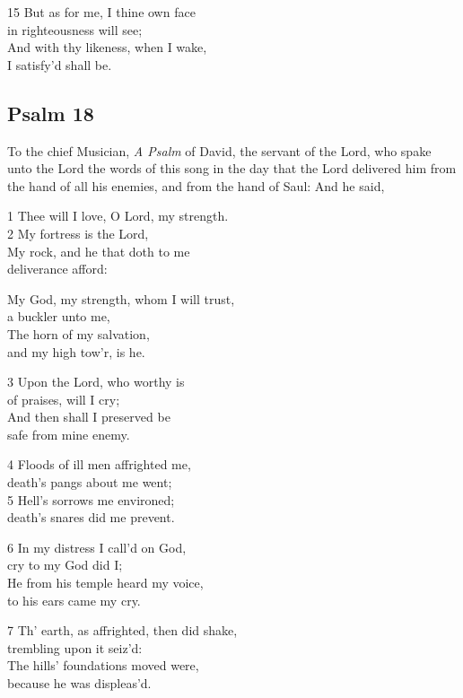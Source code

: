 15 But as for me, I thine own face\\
in righteousness will see;\\
And with thy likeness, when I wake,\\
I satisfy’d shall be.

\begin{center}
\quad{}\quad{}
\end{center}

\subsection*{Psalm 18 }


To the chief Musician, \emph{A Psalm} of David, the servant of the Lord, who spake unto the Lord the words of this song in the day that the Lord delivered him from the hand of all his enemies, and from the hand of Saul: And he said,

1 Thee will I love, O Lord, my strength.\\
2 My fortress is the Lord,\\
My rock, and he that doth to me\\
deliverance afford:

My God, my strength, whom I will trust,\\
a buckler unto me,\\
The horn of my salvation,\\
and my high tow’r, is he.

3 Upon the Lord, who worthy is\\
of praises, will I cry;\\
And then shall I preserved be\\
safe from mine enemy.

4 Floods of ill men affrighted me,\\
death’s pangs about me went;\\
5 Hell’s sorrows me environed;\\
death’s snares did me prevent.

6 In my distress I call’d on God,\\
cry to my God did I;\\
He from his temple heard my voice,\\
to his ears came my cry.

7 Th’ earth, as affrighted, then did shake,\\
trembling upon it seiz’d:\\
The hills’ foundations moved were,\\
because he was displeas’d.

